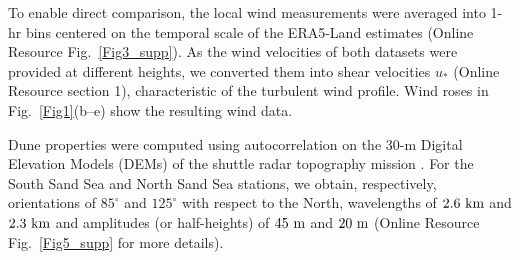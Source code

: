 To enable direct comparison, the local wind measurements were averaged into 1-hr bins centered on the temporal scale of the ERA5-Land estimates (Online Resource Fig.~\ref{Fig3_supp}). As the wind velocities of both datasets were provided at different heights, we converted them into shear velocities $u_{*}$ (Online Resource section 1), characteristic of the turbulent wind profile. Wind roses in Fig.~\ref{Fig1}(b--e) show the resulting wind data.

Dune properties were computed using autocorrelation on the 30-m Digital Elevation Models (DEMs) of the shuttle radar topography mission \citep{Farr2007}. For the South Sand Sea and North Sand Sea stations, we obtain, respectively, orientations of $85^\circ$ and $125^\circ$ with respect to the North, wavelengths of $2.6~\textup{km}$ and $2.3~\textup{km}$ and amplitudes (or half-heights) of $45~\textup{m}$ and $20~\textup{m}$ (Online Resource Fig.~\ref{Fig5_supp} for more details).


